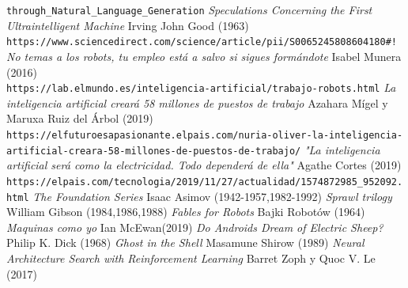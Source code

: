 \documentclass[12pt,a4paper]{article}
\begin{document}
\begin{thebibliography}{9}
\texttt{through\_Natural\_Language\_Generation}
 \textit{Speculations Concerning the First Ultraintelligent Machine} Irving John Good (1963)
\\\texttt{https://www.sciencedirect.com/science/article/pii/S0065245808604180\#!}
 \textit{No temas a los robots, tu empleo está a salvo si sigues formándote} Isabel Munera (2016)
\\\texttt{https://lab.elmundo.es/inteligencia-artificial/trabajo-robots.html}
 \textit{La inteligencia artificial creará 58 millones de puestos de trabajo} Azahara Mígel y Maruxa Ruiz del Árbol (2019)
\\\texttt{https://elfuturoesapasionante.elpais.com/nuria-oliver-la-inteligencia-}
\\\texttt{artificial-creara-58-millones-de-puestos-de-trabajo/}
 \textit{"La inteligencia artificial será como la electricidad. Todo dependerá de ella"} Agathe Cortes (2019)
\\\texttt{https://elpais.com/tecnologia/2019/11/27/actualidad/1574872985\_952092.html}
 \textit{The Foundation Series} Isaac Asimov (1942-1957,1982-1992)
 \textit{Sprawl trilogy} William Gibson (1984,1986,1988)
 \textit{Fables for Robots} Bajki Robotów (1964)
 \textit{Maquinas como yo} Ian McEwan(2019)
 \textit{Do Androids Dream of Electric Sheep?} Philip K. Dick (1968)
 \textit{Ghost in the Shell} Masamune Shirow (1989)
 \textit{Neural Architecture Search with Reinforcement Learning} Barret Zoph y Quoc V. Le (2017)
\end{thebibliography}
\end{document}
